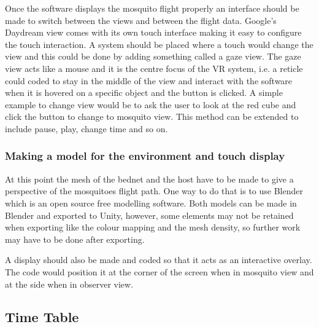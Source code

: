 Once the software displays the mosquito flight properly an interface should be made to switch between the views and between the flight data. Google's Daydream\textregistered{} view comes with its own touch interface making it easy to configure the touch interaction. A system should be placed where a touch would change the view and this could be done by adding something called a gaze view. The gaze view acts like a mouse and it is the centre focus of the VR system, i.e. a reticle could coded to stay in the middle of the view and interact with the software when it is hovered on a specific object and the button is clicked. A simple example to change view would be to ask the user to look at the red cube and click the button to change to mosquito view. This method can be extended to include pause, play, change time and so on.

\subsubsection{Making a model for the environment and touch display}

At this point the mesh of the bednet and the host have to be made to give a perspective of the mosquitoes flight path. One way to do that is to use Blender which is an open source free modelling software. Both models can be made in Blender and exported to Unity, however, some elements may not be retained when exporting like the colour mapping and the mesh density, so further work may have to be done after exporting. 

A display should also be made and coded so that it acts as an interactive overlay. The code would position it at the corner of the screen when in mosquito view and at the side when in observer view. 

\begin{landscape}
\subsection{Time Table}
\end{landscape}

